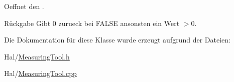 Oeffnet den .

\begin{DoxyReturn}{Rückgabe}
Gibt 0 zurueck bei F\+A\+L\+SE ansonsten ein Wert $>$0. 
\end{DoxyReturn}


Die Dokumentation für diese Klasse wurde erzeugt aufgrund der Dateien\+:\begin{DoxyCompactItemize}
\item 
Hal/\hyperlink{_measuring_tool_8h}{Measuring\+Tool.\+h}\item 
Hal/\hyperlink{_measuring_tool_8cpp}{Measuring\+Tool.\+cpp}\end{DoxyCompactItemize}
